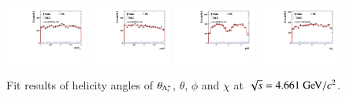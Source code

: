 \begin{figure}[H]\centering
    \includegraphics[width=0.24\textwidth]{figure/polarimetery/angular_plots/pkpi_4660_cos_theta0.pdf}
    \includegraphics[width=0.24\textwidth]{figure/polarimetery/angular_plots/pkpi_4660_cos_theta1.pdf}
    \includegraphics[width=0.24\textwidth]{figure/polarimetery/angular_plots/pkpi_4660_phi1.pdf}
    \includegraphics[width=0.24\textwidth]{figure/polarimetery/angular_plots/pkpi_4660_phi2.pdf}
    \caption{Fit results of helicity angles of $\theta_{\Lambda_{c}^{+}}$, $\theta$, $\phi$ and $\chi$ at $\sqrt{s} = 4.661\gev/c^2$.}
\label{fig:fit_angular_s4}
\end{figure}


